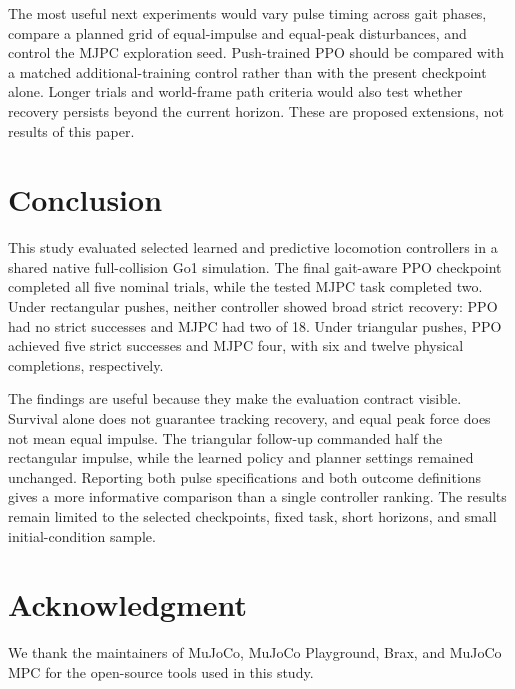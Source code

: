 \documentclass[conference]{IEEEtran}
\begin{document}
The most useful next experiments would vary pulse timing across gait phases, compare a planned grid of equal-impulse and equal-peak disturbances, and control the MJPC exploration seed. Push-trained PPO should be compared with a matched additional-training control rather than with the present checkpoint alone. Longer trials and world-frame path criteria would also test whether recovery persists beyond the current horizon. These are proposed extensions, not results of this paper.

\section{Conclusion}

This study evaluated selected learned and predictive locomotion controllers in a shared native full-collision Go1 simulation. The final gait-aware PPO checkpoint completed all five nominal trials, while the tested MJPC task completed two. Under rectangular pushes, neither controller showed broad strict recovery: PPO had no strict successes and MJPC had two of 18. Under triangular pushes, PPO achieved five strict successes and MJPC four, with six and twelve physical completions, respectively.

The findings are useful because they make the evaluation contract visible. Survival alone does not guarantee tracking recovery, and equal peak force does not mean equal impulse. The triangular follow-up commanded half the rectangular impulse, while the learned policy and planner settings remained unchanged. Reporting both pulse specifications and both outcome definitions gives a more informative comparison than a single controller ranking. The results remain limited to the selected checkpoints, fixed task, short horizons, and small initial-condition sample.

\section*{Acknowledgment}

We thank the maintainers of MuJoCo, MuJoCo Playground, Brax, and MuJoCo MPC for the open-source tools used in this study.
\end{document}
